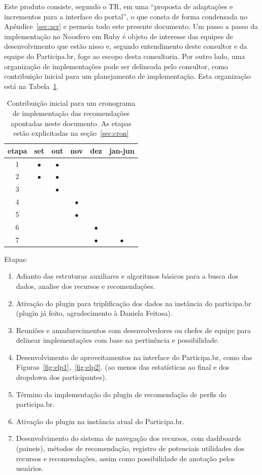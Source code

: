 \documentclass[12pt]{article}
\begin{document}
Este produto consiste, segundo o TR, em uma ``proposta de adaptações e incrementos para a interface do portal'', o que consta de forma condensada no Apêndice~\ref{sec:acr} e permeia todo este presente documento. Um passo a passo da implementação no Noosfero em Ruby é objeto de interesse das equipes de desenvolvimento que estão nisso e, segundo entendimento deste consultor e da equipe do Participa.br, foge ao escopo desta consultoria. Por outro lado, uma organização de implementações pode ser delineada pelo consultor, como contribuição inicial para um planejamento de implementação. Esta organização está na Tabela~\ref{crono}.
\begin{table}
\centering
\begin{tabular}{ | c || c | c | c | c | c |}\hline
etapa & set & out & nov & dez & jan-jun \\\hline\hline
1 & $\bullet$ & $\bullet$ & & & \\\hline
2 & $\bullet$ & $\bullet$ & & & \\\hline
3 & & $\bullet$ & & & \\\hline
4 & & & $\bullet$ & & \\\hline
5 & & & $\bullet$ & & \\\hline
6 & & & & $\bullet$ & \\\hline
7 & & & & $\bullet$ & $\bullet$ \\\hline
\end{tabular}
\caption{Contribuição inicial para um cronograma de implementação das recomendações apontadas neste documento. As etapas estão explicitadas na seção~\ref{sec:cron}}
\label{crono}
\end{table}

Etapas:
\begin{enumerate}
    \item Adianto das estruturas auxiliares e algoritmos básicos para a busca dos dados, analise dos recursos e recomendações.
    \item Ativação do plugin para triplificação dos dados na instância do participa.br (plugin já feito, agradecimento à Daniela Feitosa).
    \item Reuniões e amadurecimentos com desenvolvedores ou chefes de equipe para delinear implementações com base na pertinência e possibilidade.
    \item Desenvolvimento de aproveitamentos na interface do Participa.br, como das Figuras~\ref{fig:elp1},~\ref{fig:elp2}. (ao menos das estatísticas ao final e dos dropdown dos participantes).
    \item Término da implementação do plugin de recomendação de perfis do participa.br.
    \item Ativação do plugin na instância atual do Participa.br.
    \item Desenvolvimento do sistema de navegação dos recursos, com dashboards (paineis), métodos de recomendação, registro de potenciais utilidades dos recursos e recomendações, assim como possibilidade de anotação pelos usuários.
\end{enumerate}
\end{document}
